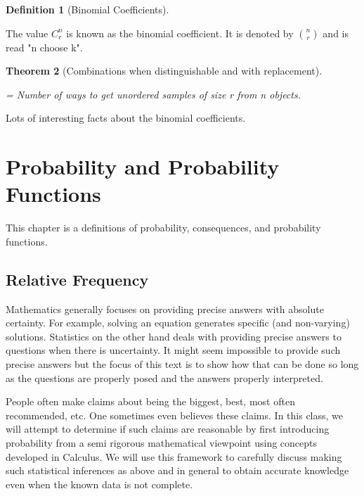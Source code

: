 \documentclass[10pt,]{book}
\theoremstyle{plain}
\newtheorem{theorem}{Theorem}[section]
\theoremstyle{definition}
\newtheorem{definition}[theorem]{Definition}
\theoremstyle{definition}
\numberwithin{equation}{section}
\begin{document}
\begin{definition}[Binomial Coefficients]\label{definition-3}

		The value \(C_r^n\) is known as the binomial coefficient. It is
		denoted by \({n \choose r}\) and is read "n choose k".
\end{definition}
\begin{theorem}[Combinations when distinguishable and with replacement]\label{theorem-14}

	= Number of ways to get unordered samples of size r from n objects. 
	\end{theorem}
\par
Lots of interesting facts about the binomial coefficients.%
\typeout{************************************************}
\typeout{************************************************}
\chapter[Probability and Probability Functions]{Probability and Probability Functions}\label{ProbabilityGeneralities}
\typeout{************************************************}
\typeout{************************************************}
This chapter is a definitions of probability, consequences, and probability functions.%
\typeout{************************************************}
\typeout{************************************************}
\section[Relative Frequency]{Relative Frequency}\label{RelativeFrequency}
Mathematics generally focuses on providing precise answers with absolute certainty. For example, solving an equation generates specific (and non-varying) solutions. Statistics on the other hand deals with providing precise answers to questions when there is uncertainty. It might seem impossible to provide such precise answers but the focus of this text is to show how that can be done so long as the questions are properly posed and the answers properly interpreted.%
\par
People often make claims about being the biggest, best, most often recommended, etc. One sometimes even believes these claims. In this class, we will attempt to determine if such claims are reasonable by first introducing probability from a semi rigorous mathematical viewpoint using concepts developed in Calculus. We will use this framework to carefully discuss making such statistical inferences as above and in general to obtain accurate knowledge even when the known data is not complete. %
\typeout{************************************************}
\typeout{************************************************}
\end{document}
